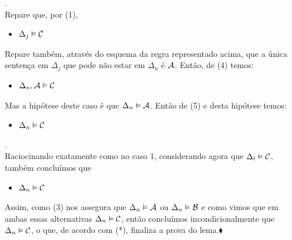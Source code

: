    \begin{ebullet}
	   \item[\emph{Caso 1: \ \ $\Delta_n \entails \meta{A}$}].
	   		\\Repare que, por (1),
	   		\begin{itemize}
	   			\item[(4)] $\Delta_j \vDash \mathcal{C}$
	   		\end{itemize}
	   		Repare também, através do esquema da regra representado acima, que a única sentença em $\Delta_{j}$ que pode não estar em $\Delta_{n}$ é $\mathcal{A}$. Então, de (4) temos:
	   		\begin{itemize}
				\item[(5)] $\Delta_n, \mathcal{A} \vDash \mathcal{C}$
			\end{itemize} 
			Mas a hipótese deste caso é que $\Delta_n \entails \meta{A}$. Então de (5) e desta hipótese temos:
			\begin{itemize}
				\item[(6)] $\Delta_n \vDash \mathcal{C}$
			\end{itemize}
	   \item[\emph{Caso 2: \ \ $\Delta_n \entails \meta{B}$}].
	   		\\Raciocinando exatamente como no caso 1, considerando agora que $\Delta_l \vDash \mathcal{C}$, também concluímos que
		   \begin{itemize}
	   			\item[(7)] $\Delta_n \vDash \mathcal{C}$
	   		\end{itemize}
	\end{ebullet}
Assim, como (3) nos assegura que $\Delta_n \entails \meta{A}$ ou $\Delta_n \entails \meta{B}$ e como vimos que em ambas essas alternativas $\Delta_n \vDash \mathcal{C}$, então concluímos incondicionalmente que $\Delta_n \vDash \mathcal{C}$, o que, de acordo com (*), finaliza a prova do lema.$\blacklozenge$

